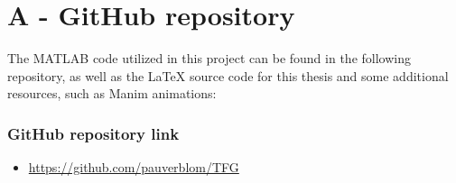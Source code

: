 \chapter*{A - GitHub repository}
\label{AppendixA}

The MATLAB code utilized in this project can be found in the following repository, as well as the LaTeX source code for this thesis and some additional resources, such as Manim animations:

\subsection*{GitHub repository link}
\begin{itemize}
    \item \url{https://github.com/pauverblom/TFG}
\end{itemize}

